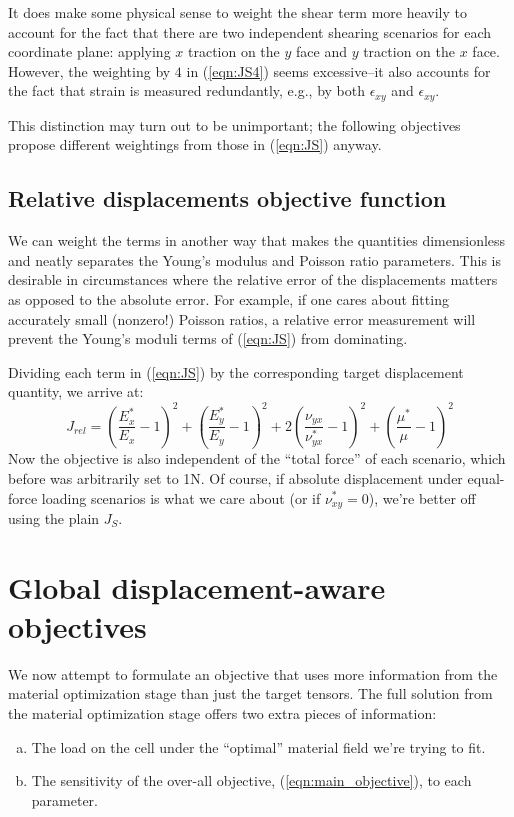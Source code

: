 \documentclass[10pt]{article}
\begin{document}
It does make some physical sense to weight the shear term more heavily to
account for the fact that there are two independent shearing scenarios for each
coordinate plane: applying $x$ traction on the $y$ face and $y$ traction on the
$x$ face. However, the weighting by $4$ in (\ref{eqn:JS4}) seems excessive--it
also accounts for the fact that strain is measured redundantly, e.g., by both
$\epsilon_{xy}$ and $\epsilon_{xy}$.

This distinction may turn out to be unimportant; the following objectives
propose different weightings from those in (\ref{eqn:JS}) anyway.

\subsection{Relative displacements objective function}
We can weight the terms in another way that makes the quantities dimensionless
and neatly separates the Young's modulus and Poisson ratio parameters. This is
desirable in circumstances where the relative error of the displacements matters
as opposed to the absolute error. For example, if one cares about fitting
accurately small (nonzero!) Poisson ratios, a relative error measurement will
prevent the Young's moduli terms of (\ref{eqn:JS}) from dominating.

Dividing each term in (\ref{eqn:JS}) by the corresponding target displacement
quantity, we arrive at:
$$
J_{rel} = \left(\frac{E_x^*}{E_x} - 1 \right)^2 + \left(\frac{E_y^*}{E_y} - 1 \right)^2
    + 2 \left(\frac{\nu_{yx}}{\nu_{yx}^*} - 1 \right)^2
    + \left(\frac{\mu^*}{\mu} - 1 \right)^2
$$
Now the objective is also independent of the ``total force'' of each scenario,
which before was arbitrarily set to 1N.
Of course, if absolute displacement under equal-force loading scenarios is what we
care about (or if $\nu_{xy}^* = 0$), we're better off using the plain $J_S$.

\section{Global displacement-aware objectives}
We now attempt to formulate an objective that uses more information from the
material optimization stage than just the target tensors. The full solution
from the material optimization stage offers two extra pieces of information:

\begin{enumerate}[(a)]
    \item The load on the cell under the ``optimal'' material field we're trying to fit.
          \label{it:load}
    \item The sensitivity of the over-all objective, (\ref{eqn:main_objective}),
          to each parameter.
          \label{it:sensitivity}
\end{enumerate}
\end{document}
